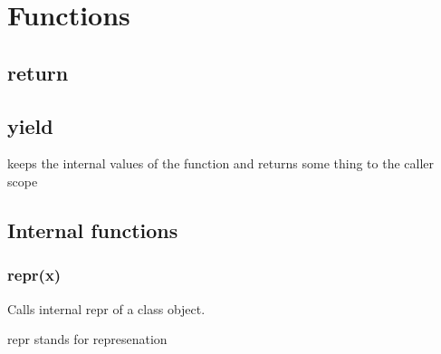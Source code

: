 \chapter{Functions}

\section{return}

\section{yield}
    
    keeps the internal values of the function and returns some thing to the caller scope
    
    
\section{Internal functions}
    
    \subsection{repr(x)}
        
        Calls internal repr of a class object.
        
        repr stands for represenation